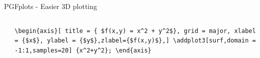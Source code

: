 \documentclass[aspectratio=169]{beamer}
\begin{document}
\begin{frame}{PGFplots - Easier 3D plotting}
    \begin{columns}[T]
    \begin{column}{.45\textwidth}
        \end{column}\hfill
        \begin{column}{.48\textwidth}
        
            \vspace{30pt}
        
            \texttt{\textbackslash begin\{axis\}[ title = \{ \$f(x,y) = x\^{}2 + y\^{}2\$\}, grid = major, xlabel = \{\$x\$\}, ylabel = \{\$y\$\},zlabel=\{\$f(x,y)\$\},]
                    \textbackslash addplot3[surf,domain = -1:1,samples=20] \{x\^{}2+y\^{}2\};
                \textbackslash end\{axis\}}
        \end{column}
    \end{columns}
\end{frame}
\end{document}
